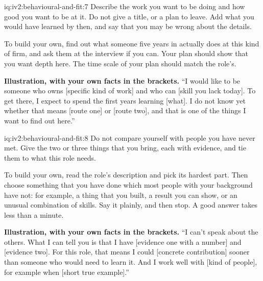 \begin{solution}{iq:iv2:behavioural-and-fit:7}
Describe the work you want to be doing and how good you want to be at it. Do not give a title, or a plan to leave. Add what you would have learned by then, and say that you may be wrong about the details.

To build your own, find out what someone five years in actually does at this kind of firm, and ask them at the interview if you can. Your plan should show that you want depth here. The time scale of your plan should match the role's.

\textbf{Illustration, with your own facts in the brackets.} ``I would like to be someone who owns [specific kind of work] and who can [skill you lack today]. To get there, I expect to spend the first years learning [what]. I do not know yet whether that means [route one] or [route two], and that is one of the things I want to find out here.''

\end{solution}

\begin{solution}{iq:iv2:behavioural-and-fit:8}
Do not compare yourself with people you have never met. Give the two or three things that you bring, each with evidence, and tie them to what this role needs.

To build your own, read the role's description and pick its hardest part. Then choose something that you have done which most people with your background have not: for example, a thing that you built, a result you can show, or an unusual combination of skills. Say it plainly, and then stop. A good answer takes less than a minute.

\textbf{Illustration, with your own facts in the brackets.} ``I can't speak about the others. What I can tell you is that I have [evidence one with a number] and [evidence two]. For this role, that means I could [concrete contribution] sooner than someone who would need to learn it. And I work well with [kind of people], for example when [short true example].''

\end{solution}

